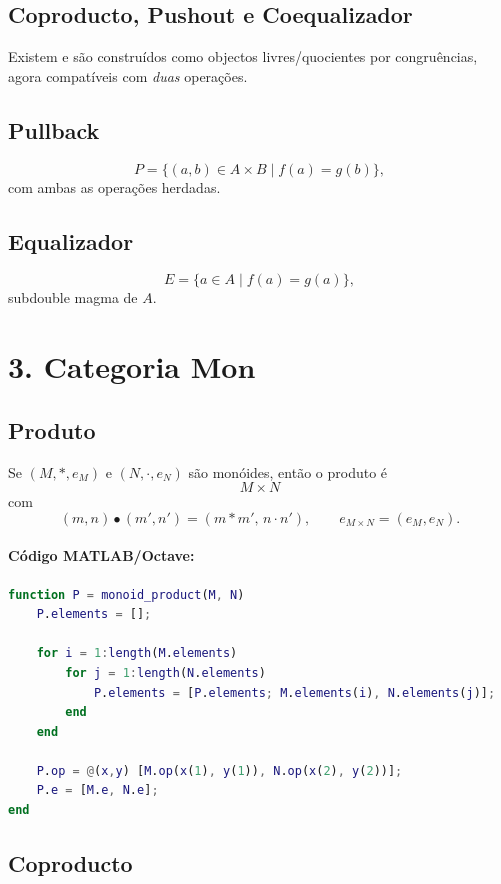\documentclass[a4paper,12pt]{article}
\begin{document}
\subsection*{Coproducto, Pushout e Coequalizador}

Existem e são construídos como objectos livres/quocientes por congruências,
agora compatíveis com \emph{duas} operações.

\subsection*{Pullback}

\[
P=\{(a,b)\in A\times B\mid f(a)=g(b)\},
\]
com ambas as operações herdadas.

\subsection*{Equalizador}

\[
E=\{a\in A\mid f(a)=g(a)\},
\]
subdouble magma de $A$.

\section*{3. Categoria \(\mathbf{Mon}\)}

\subsection*{Produto}

Se $(M,\ast,e_M)$ e $(N,\cdot,e_N)$ são monóides, então o produto é
\[
M\times N
\]
com
\[
(m,n)\bullet(m',n')=(m\ast m',\, n\cdot n'),
\qquad
e_{M\times N}=(e_M,e_N).
\]

\paragraph{Código MATLAB/Octave:}
\begin{lstlisting}[language=Matlab]
function P = monoid_product(M, N)
    P.elements = [];
    
    for i = 1:length(M.elements)
        for j = 1:length(N.elements)
            P.elements = [P.elements; M.elements(i), N.elements(j)];
        end
    end
    
    P.op = @(x,y) [M.op(x(1), y(1)), N.op(x(2), y(2))];
    P.e = [M.e, N.e];
end
\end{lstlisting}

\subsection*{Coproducto}
\end{document}
